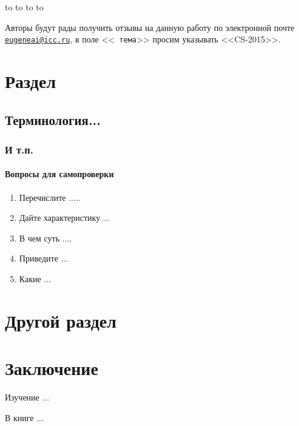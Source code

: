 \documentclass[14pt, openany, twoside, draft]{extbook} %
\newenvironment{questions}{\subsubsection*{Вопросы для самопроверки}\begin{enumerate}\itemsep0pt minus 0.3pt\parskip0pt plus 0.3pt}{\end{enumerate}}
\begin{document}
\medskip
\noindent\hbox to \linewidth{\hfill\sf Старший~научный сотрудник ИДСТУ СО РАН,}
\noindent\hbox to \linewidth{\hfill\sf доцент кафедры ИТ ИМЭИ ИГУ}
\noindent\hbox to \linewidth{\hfill\sf кандидат~технических~наук}
\noindent\hbox to \linewidth{\hfill\sf Е.~А.~Черкашин}

\vfill
\makeatletter
{} Авторы будут рады получить отзывы на данную
работу по электронной почте
\href{mailto:eugeneai@icc.ru}{\tt{}eugeneai@icc.ru}, в поле <<{\tt
  тема}>> просим указывать <<CS-2015>>.
\makeatother

\chapter{Раздел}


\section{Терминология...}


\subsection{И т.п.}


\begin{questions}
\item{} Перечислите .....
\item{} Дайте характеристику ...
\item{} В чем суть ....
\item{} Приведите ...
\item{} Какие ...
\end{questions}

\chapter{Другой раздел}


\chapter*{Заключение}


Изучение ...

В книге ...
\end{document}
